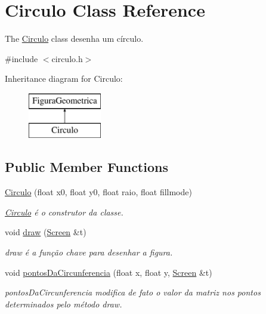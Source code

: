 \hypertarget{class_circulo}{}\section{Circulo Class Reference}
\label{class_circulo}


The \mbox{\hyperlink{class_circulo}{Circulo}} class desenha um círculo.  




{\ttfamily \#include $<$circulo.\+h$>$}

Inheritance diagram for Circulo\+:\begin{figure}[H]
\begin{center}
\leavevmode
\includegraphics[height=2.000000cm]{class_circulo}
\end{center}
\end{figure}
\subsection*{Public Member Functions}
\begin{DoxyCompactItemize}
\item 
\mbox{\hyperlink{class_circulo_a5e0622e82a3ce86c9f7d247956bf98b3}{Circulo}} (float x0, float y0, float raio, float fillmode)
\begin{DoxyCompactList}\small\item\em \mbox{\hyperlink{class_circulo}{Circulo}} é o construtor da classe. \end{DoxyCompactList}\item 
void \mbox{\hyperlink{class_circulo_a593787d6e0618c2eded23e8839e7bea6}{draw}} (\mbox{\hyperlink{class_screen}{Screen}} \&t)
\begin{DoxyCompactList}\small\item\em draw é a função chave para desenhar a figura. \end{DoxyCompactList}\item 
void \mbox{\hyperlink{class_circulo_ac7946aa1d6e6a1290d123bdd542a2a90}{pontos\+Da\+Circunferencia}} (float x, float y, \mbox{\hyperlink{class_screen}{Screen}} \&t)
\begin{DoxyCompactList}\small\item\em pontos\+Da\+Circunferencia modifica de fato o valor da matriz nos pontos determinados pelo método draw. \end{DoxyCompactList}\end{DoxyCompactItemize}


